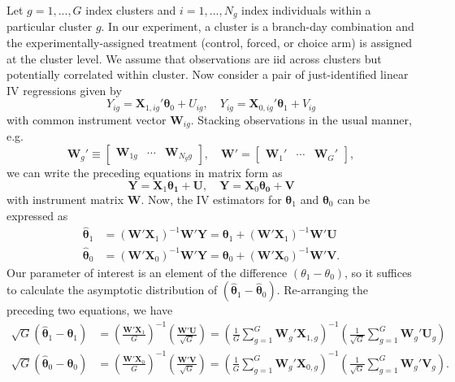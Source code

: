 Let $g = 1, ..., G$ index clusters and $i = 1, ..., N_g$ index individuals within a particular cluster $g$. 
In our experiment, a cluster is a branch-day combination and the experimentally-assigned treatment (control, forced, or choice arm) is assigned at the cluster level.
We assume that observations are iid across clusters but potentially correlated within cluster.
Now consider a pair of just-identified linear IV regressions given by
\[
Y_{ig} = \boldsymbol{X}_{1,ig}' \boldsymbol{\theta}_0 + U_{ig}, \quad
Y_{ig} = \boldsymbol{X}_{0,ig}' \boldsymbol{\theta}_1 + V_{ig}
\]
with common instrument vector $\boldsymbol{W}_{ig}$. 
Stacking observations in the usual manner, e.g.\
\[
\mathbf{W}_g' \equiv \begin{bmatrix}
\boldsymbol{W}_{1g} & \cdots & 
\boldsymbol{W}_{N_gg} 
\end{bmatrix}, \quad
\mathbf{W}' = \begin{bmatrix}
\mathbf{W}_1' & \cdots & \mathbf{W}_G'
\end{bmatrix},
\]
we can write the preceding equations in matrix form as
\[
\mathbf{Y} = \mathbf{X}_1\boldsymbol{\theta_1} + \mathbf{U}, \quad
\mathbf{Y} = \mathbf{X}_0\boldsymbol{\theta_0} + \mathbf{V}
\]
with instrument matrix $\mathbf{W}$.
Now, the IV estimators for $\boldsymbol{\theta}_1$ and $\boldsymbol{\theta}_0$ can be expressed as 
\begin{align*}
\widehat{\boldsymbol{\theta}}_1 
&= \left(\mathbf{W}'\mathbf{X}_1\right)^{-1}\mathbf{W}'\mathbf{Y}  = \boldsymbol{\theta}_1 + \left(\mathbf{W}'\mathbf{X}_1\right)^{-1}\mathbf{W}'\mathbf{U}\\ 
\widehat{\boldsymbol{\theta}}_0 
&= \left(\mathbf{W}'\mathbf{X}_0\right)^{-1}\mathbf{W}'\mathbf{Y} = \boldsymbol{\theta}_0 + \left(\mathbf{W}'\mathbf{X}_0\right)^{-1}\mathbf{W}'\mathbf{V}.
\end{align*}
Our parameter of interest is an element of the difference $(\theta_1 - \theta_0)$, so  it suffices to calculate the asymptotic distribution of $(\widehat{\boldsymbol{\theta}}_1 - \widehat{\boldsymbol{\theta}}_0)$.
Re-arranging the preceding two equations, we have
\begin{align*}
\sqrt{G} \left(\widehat{\boldsymbol{\theta}}_1  - \boldsymbol{\theta}_1\right) &= 
 \left(\frac{\mathbf{W}'\mathbf{X}_1}{G}\right)^{-1}\left(\frac{\mathbf{W}'\mathbf{U}}{\sqrt{G}}\right) = \left( \frac{1}{G} \sum_{g=1}^G \mathbf{W}_g' \mathbf{X}_{1,g}\right)^{-1}\left(\frac{1}{\sqrt{G}} \sum_{g=1}^G\mathbf{W}_g' \mathbf{U}_g\right) \\ 
\sqrt{G} \left(\widehat{\boldsymbol{\theta}}_0  - \boldsymbol{\theta}_0\right) &= 
 \left(\frac{\mathbf{W}'\mathbf{X}_0}{G}\right)^{-1}\left(\frac{\mathbf{W}'\mathbf{V}}{\sqrt{G}}\right) = \left( \frac{1}{G} \sum_{g=1}^G \mathbf{W}_g' \mathbf{X}_{0,g}\right)^{-1}\left(\frac{1}{\sqrt{G}} \sum_{g=1}^G\mathbf{W}_g' \mathbf{V}_g\right).
\end{align*}
